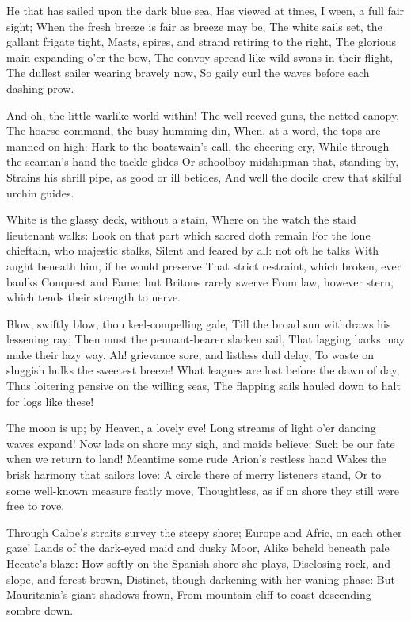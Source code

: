 \documentclass[10pt,twocolumn]{book}
\begin{document}
   He that has sailed upon the dark blue sea,
   Has viewed at times, I ween, a full fair sight;
   When the fresh breeze is fair as breeze may be,
   The white sails set, the gallant frigate tight,
   Masts, spires, and strand retiring to the right,
   The glorious main expanding o'er the bow,
   The convoy spread like wild swans in their flight,
   The dullest sailer wearing bravely now,
So gaily curl the waves before each dashing prow.


   And oh, the little warlike world within!
   The well-reeved guns, the netted canopy,
   The hoarse command, the busy humming din,
   When, at a word, the tops are manned on high:
   Hark to the boatswain's call, the cheering cry,
   While through the seaman's hand the tackle glides
   Or schoolboy midshipman that, standing by,
   Strains his shrill pipe, as good or ill betides,
And well the docile crew that skilful urchin guides.


   White is the glassy deck, without a stain,
   Where on the watch the staid lieutenant walks:
   Look on that part which sacred doth remain
   For the lone chieftain, who majestic stalks,
   Silent and feared by all:  not oft he talks
   With aught beneath him, if he would preserve
   That strict restraint, which broken, ever baulks
   Conquest and Fame:  but Britons rarely swerve
From law, however stern, which tends their strength to nerve.


   Blow, swiftly blow, thou keel-compelling gale,
   Till the broad sun withdraws his lessening ray;
   Then must the pennant-bearer slacken sail,
   That lagging barks may make their lazy way.
   Ah! grievance sore, and listless dull delay,
   To waste on sluggish hulks the sweetest breeze!
   What leagues are lost before the dawn of day,
   Thus loitering pensive on the willing seas,
The flapping sails hauled down to halt for logs like these!


   The moon is up; by Heaven, a lovely eve!
   Long streams of light o'er dancing waves expand!
   Now lads on shore may sigh, and maids believe:
   Such be our fate when we return to land!
   Meantime some rude Arion's restless hand
   Wakes the brisk harmony that sailors love:
   A circle there of merry listeners stand,
   Or to some well-known measure featly move,
Thoughtless, as if on shore they still were free to rove.


   Through Calpe's straits survey the steepy shore;
   Europe and Afric, on each other gaze!
   Lands of the dark-eyed maid and dusky Moor,
   Alike beheld beneath pale Hecate's blaze:
   How softly on the Spanish shore she plays,
   Disclosing rock, and slope, and forest brown,
   Distinct, though darkening with her waning phase:
   But Mauritania's giant-shadows frown,
From mountain-cliff to coast descending sombre down.
\end{document}
